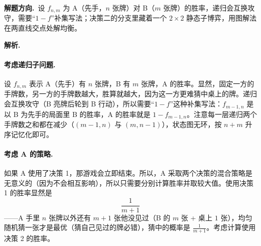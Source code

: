 \documentclass[UTF8,a4paper,11pt,oneside,openany,fontset=fandol]{ctexbook}
\theoremstyle{definition}
\newcommand{\sol}{\par\noindent\textbf{解析.}\ }
\newcommand{\hint}{\par\noindent\textbf{解题方向.}\ }
\begin{document}
\hint 设 $f_{n,m}$ 为 A（先手，$n$ 张牌）对 B（$m$ 张牌）的胜率，递归会互换攻守，需要“$1-f$”补集写法；决策二的分支里藏着一个 $2\times2$ 静态子博弈，用图解法在两直线交点处解均衡。

\sol \paragraph{考虑递归子问题.} 设 $f_{n,m}$ 表示 A（先手）有 $n$ 张牌，B 有 $m$ 张牌，A 的胜率。显然，固定一方的手牌数，另一方的手牌数越大，胜算就越大，因为这一方更难猜中桌上的牌。递归会互换攻守（B 亮牌后轮到 B 行动），所以需要“$1-f$”这种补集写法：$f_{m-1,n}$ 是以 B 为先手的局面里 B 的胜率，A 的胜率就是 $1-f_{m-1,n}$。注意每一层递归两个手牌数之和都在减少（$(m-1,n)$ 与 $(m,n-1)$），状态图无环，按 $n+m$ 升序记忆化即可。

\paragraph{考虑 A 的策略.} 如果 A 使用了决策 1，那游戏会立即结束。所以，A 采取两个决策的混合策略是无意义的（因为不会相互影响），所以只需要分别计算胜率并取较大值。使用决策 1 的胜率显然是
\[
 \frac{1}{m+1}
\]
——A 手里 $n$ 张牌以外还有 $m+1$ 张他没见过（B 的 $m$ 张 + 桌上 $1$ 张），均匀随机猜一张才是最优（猜自己见过的牌必错），猜中的概率是 $\tfrac1{m+1}$。考虑计算使用决策 2 的胜率。
\end{document}
